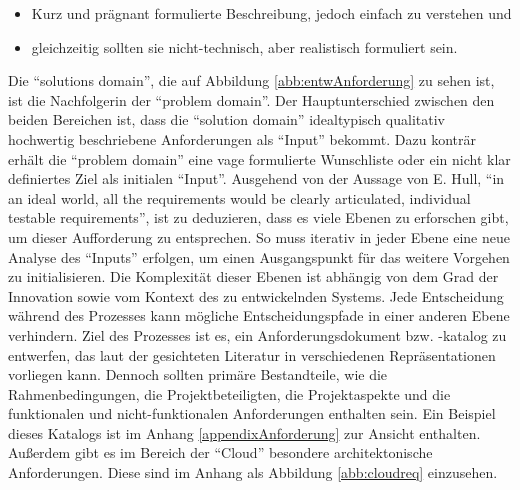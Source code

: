 \begin{itemize}
	\item Kurz und prägnant formulierte Beschreibung, jedoch einfach zu verstehen und
	\item gleichzeitig sollten sie nicht-technisch, aber realistisch formuliert sein.
\end{itemize}
 
 Die \enquote{solutions domain}, die auf Abbildung \vref{abb:entwAnforderung} zu sehen ist, ist die Nachfolgerin der \enquote{problem domain}. Der Hauptunterschied zwischen den beiden Bereichen ist, dass die \enquote{solution domain} idealtypisch qualitativ hochwertig beschriebene Anforderungen als \enquote{Input} bekommt. Dazu konträr erhält die \enquote{problem domain} eine vage formulierte Wunschliste oder ein nicht klar definiertes Ziel als initialen \enquote{Input}. Ausgehend von der Aussage von E. Hull, \enquote{in an ideal world, all the requirements would be clearly articulated, individual testable requirements}\autocite[][S.\,115]{hull_requirements_2011}, ist zu deduzieren, dass es viele Ebenen zu erforschen gibt, um dieser Aufforderung zu entsprechen. So muss iterativ in jeder Ebene eine neue Analyse des \enquote{Inputs} erfolgen, um einen Ausgangspunkt für das weitere Vorgehen zu initialisieren. Die Komplexität dieser Ebenen ist abhängig von dem Grad der Innovation sowie vom Kontext des zu entwickelnden Systems. Jede Entscheidung während des Prozesses kann mögliche Entscheidungspfade in einer anderen Ebene verhindern. Ziel des Prozesses ist es, ein Anforderungsdokument bzw. -katalog zu entwerfen, das laut der gesichteten Literatur in verschiedenen Repräsentationen vorliegen kann. Dennoch sollten primäre Bestandteile, wie die Rahmenbedingungen, die Projektbeteiligten, die Projektaspekte und die funktionalen und nicht-funktionalen Anforderungen enthalten sein. Ein Beispiel dieses Katalogs ist im Anhang \vref{appendixAnforderung} zur Ansicht enthalten. Außerdem gibt es im Bereich der \enquote{Cloud} besondere architektonische Anforderungen. Diese sind im Anhang als Abbildung \vref{abb:cloudreq} einzusehen.
 
